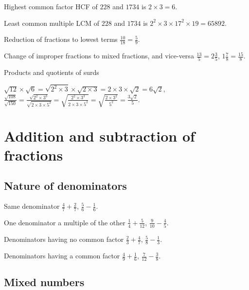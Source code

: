 \documentclass{article}
\begin{document}
Highest common factor \hfill HCF of \(228\) and \(1734\) is \(2 \times 3 = 6\).

Least common multiple \hfill LCM of \(228\) and \(1734\) is \(2^2 \times 3 \times 17^2 \times 19 = 65892\).

Reduction of fractions to lowest terms \hfill \(\frac{10}{18} = \frac{5}{9}\).

Change of improper fractions to mixed fractions, and vice-versa \hfill \(\frac{13}{5} = 2\frac{3}{5}\), \(1\frac{7}{8} = \frac{15}{8}\).

Products and quotients of surds
\vspace{-1.2cm}
\begin{flushright}
\hfill \(\sqrt{12} \times \sqrt{6} = \sqrt{2^2 \times 3} \times \sqrt{2 \times 3} = 2 \times 3 \times \sqrt{2} = 6\sqrt{2}\), \\
\(\frac{\sqrt{108}}{\sqrt{150}} = \frac{\sqrt{2^2 \times 3^3}}{\sqrt{2 \times 3 \times 5^2}} = \sqrt{\frac{2^2 \times 3^3}{2 \times 3 \times 5^2}} = \sqrt{\frac{2 \times 3^2}{5^2}} = \frac{3\sqrt{2}}{5}.\)
\end{flushright}

\section{Addition and subtraction of fractions}

\subsection{Nature of denominators}

Same denominator \hfill \(\frac{4}{7} + \frac{2}{7}\), \(\frac{5}{6} - \frac{1}{6}\).

One denominator a multiple of the other \hfill \(\frac{1}{4} + \frac{5}{12}\), \(\frac{9}{10} - \frac{4}{5}\).

Denominators having no common factor \hfill \(\frac{2}{3} + \frac{4}{7}\), \(\frac{5}{8} - \frac{1}{3}\).

Denominators having a common factor \hfill \(\frac{4}{9} + \frac{1}{6}\), \(\frac{7}{12} - \frac{3}{8}\).

\subsection{Mixed numbers}
\end{document}
